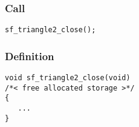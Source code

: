 \subsubsection*{Call}
\begin{verbatim}sf_triangle2_close();\end{verbatim}

\subsubsection*{Definition}
\begin{verbatim}
void sf_triangle2_close(void)
/*< free allocated storage >*/
{
   ...
}
\end{verbatim}





